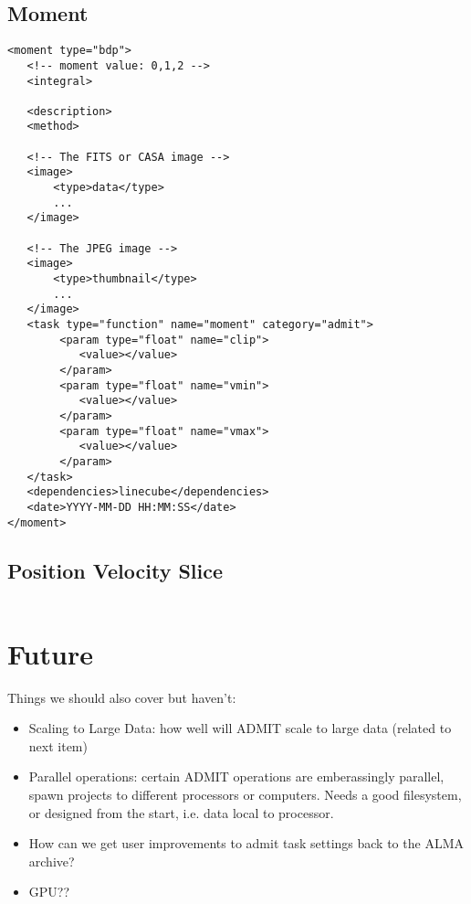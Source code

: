 \documentclass{article}
\begin{document}
\subsection{Moment}
\footnotesize
\begin{verbatim}
<moment type="bdp">
   <!-- moment value: 0,1,2 -->
   <integral>          

   <description>
   <method>

   <!-- The FITS or CASA image -->
   <image> 
       <type>data</type>
       ...
   </image>  

   <!-- The JPEG image -->
   <image> 
       <type>thumbnail</type>
       ...
   </image>  
   <task type="function" name="moment" category="admit">
        <param type="float" name="clip">
           <value></value>
        </param>
        <param type="float" name="vmin">
           <value></value>
        </param>
        <param type="float" name="vmax">
           <value></value>
        </param>
   </task>
   <dependencies>linecube</dependencies>
   <date>YYYY-MM-DD HH:MM:SS</date>
</moment>
\end{verbatim}

\subsection{Position Velocity Slice}
\footnotesize
\begin{verbatim}
\end{verbatim}

\section{Future}

Things we should also cover but haven't:

\begin{itemize}

\item
Scaling to Large Data:  how well will ADMIT scale to large data (related
to next item)

\item
Parallel operations:  certain ADMIT operations are emberassingly parallel, spawn
projects to different processors or computers.  Needs a good filesystem, or
designed from the start, i.e. data local to processor.

\item
How can we get user improvements to admit task settings back to the ALMA archive?

\item
GPU??

\end{itemize}
\end{document}
